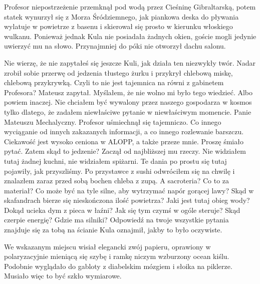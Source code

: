 Profesor niepostrzeżenie przemknął pod wodą przez Cieśninę Gibraltarską, potem statek wynurzył się z Morza Śródziemnego, 
jak piankowa deska do pływania wylatuje w powietrze z basenu i skierował się prosto w kierunku włoskiego wulkanu.
Ponieważ jednak Kula nie posiadała żadnych okien, goście mogli jedynie uwierzyć mu na słowo. Przynajmniej do póki nie otworzył dachu salonu.

\begin{dialogue}
\ds{} Nie wierzę, że nie zapytałeś się jeszcze Kuli, jak działa ten niezwykły twór. \dm{} Nadar zrobił sobie przerwę od jedzenia 
tłustego żurku i przykrył chlebową miskę, chlebową przykrywką.
\ds{} Czyli to nie jest tajemnica na równi z gabinetem Profesora? \dm{} Mateusz zapytał. \dm{} Myślałem, że nie wolno mi było tego wiedzieć.
Albo powiem inaczej. Nie chciałem być wywalony przez naszego gospodarza w kosmos tylko dlatego, że zadałem niewłaściwe pytanie w niewłaściwym momencie.
\ds{} Panie Mateuszu Mechalyczny. \dm{} Profesor uśmiechnął się tajemniczo. \dm{} Co innego wyciąganie od innych zakazanych informacji, a co innego rozlewanie barszczu. 
Ciekawość jest wysoko ceniona w ALOPP, a także przeze mnie. Proszę śmiało pytać.
\ds{} Zatem skąd to jedzenie? \dm{} Zaczął od najbliższej mu rzeczy. \dm{} Nie widziałem tutaj żadnej kuchni, nie widziałem spiżarni.
Te dania po prostu się tutaj pojawiły, jak przyszliśmy. Po przystawce z sushi odwróciłem się na chwilę i znalazłem zaraz przed sobą bochen chleba z zupą.
A sacroteria? Co to za materiał? Co może być na tyle silne, aby wytrzymać napór gorącej lawy? 
Skąd w skafandrach bierze się nieskończona ilość powietrza? Jaki jest tutaj obieg wody? 
Dokąd ucieka dym z pieca w łaźni? Jak się tym czymś w ogóle steruje? Skąd czerpie energię? Gdzie ma silniki?
\ds{} Odpowiedź na twoje wszystkie pytania znajduje się za tobą na ścianie \dm{} Kula oznajmił, jakby to było oczywiste.
\end{dialogue}

We wskazanym miejscu wisiał elegancki zwój papieru, oprawiony w polaryzacyjnie mieniącą się szybę i ramkę niczym wzburzony ocean kiślu.
Podobnie wyglądało do gabloty z diabelskim mózgiem i słoika na piklerze. Musiało więc to być szkło wymiarowe.


